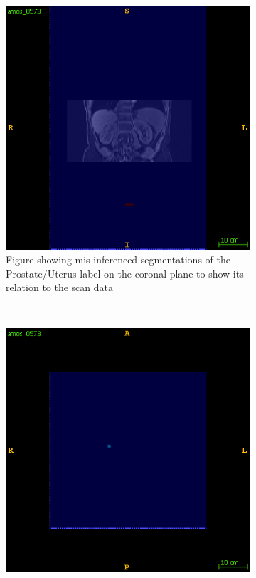 \documentclass{l4proj}
\begin{document}
\begin{figure}[htb]
\begin{subfigure}[b]{0.45\textwidth}
        \includegraphics[width=\textwidth]{images/ghost_12.png}
        \caption{Figure showing mis-inferenced segmentations of the Prostate/Uterus label on the coronal plane to show its relation to the scan data}
        \label{fig:additional_mis_inference_ghost_12}
    \end{subfigure}
    \\
    \begin{subfigure}[b]{0.45\textwidth}
        \includegraphics[width=\textwidth]{images/ghost_2.png}

\end{subfigure}
\end{figure}
\end{document}
